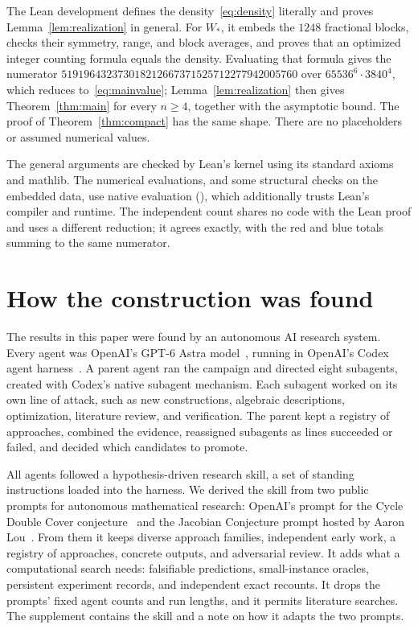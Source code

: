 \documentclass[11pt]{article}
\theoremstyle{definition}
\theoremstyle{remark}
\newcommand{\code}[1]{\texttt{\detokenize{#1}}}
\begin{document}
The Lean development defines the density~\eqref{eq:density} literally and proves Lemma~\ref{lem:realization} in general.
For $W_*$, it embeds the $1248$ fractional blocks, checks their symmetry, range, and block averages, and proves that an optimized integer counting formula equals the density.
Evaluating that formula gives the numerator $519196432373018212667371525712277942005760$ over $65536^6\cdot3840^4$, which reduces to~\eqref{eq:mainvalue}; Lemma~\ref{lem:realization} then gives Theorem~\ref{thm:main} for every $n\ge4$, together with the asymptotic bound.
The proof of Theorem~\ref{thm:compact} has the same shape.
There are no \code{sorry} placeholders or assumed numerical values.

The general arguments are checked by Lean's kernel using its standard axioms and mathlib.
The numerical evaluations, and some structural checks on the embedded data, use native evaluation (\code{native_decide}), which additionally trusts Lean's compiler and runtime.
The independent count shares no code with the Lean proof and uses a different reduction; it agrees exactly, with the red and blue totals summing to the same numerator.

\section{How the construction was found}
\label{sec:methods}

The results in this paper were found by an autonomous AI research system.
Every agent was OpenAI's GPT-6 Astra model~\cite{astra2026}, running in OpenAI's Codex agent harness~\cite{codex}.
A parent agent ran the campaign and directed eight subagents, created with Codex's native subagent mechanism.
Each subagent worked on its own line of attack, such as new constructions, algebraic descriptions, optimization, literature review, and verification.
The parent kept a registry of approaches, combined the evidence, reassigned subagents as lines succeeded or failed, and decided which candidates to promote.

All agents followed a hypothesis-driven research skill, a set of standing instructions loaded into the harness.
We derived the skill from two public prompts for autonomous mathematical research: OpenAI's prompt for the Cycle Double Cover conjecture~\cite{cdcprompt} and the Jacobian Conjecture prompt hosted by Aaron Lou~\cite{jacobianprompt}.
From them it keeps diverse approach families, independent early work, a registry of approaches, concrete outputs, and adversarial review.
It adds what a computational search needs: falsifiable predictions, small-instance oracles, persistent experiment records, and independent exact recounts.
It drops the prompts' fixed agent counts and run lengths, and it permits literature searches.
The supplement contains the skill and a note on how it adapts the two prompts.
\end{document}
